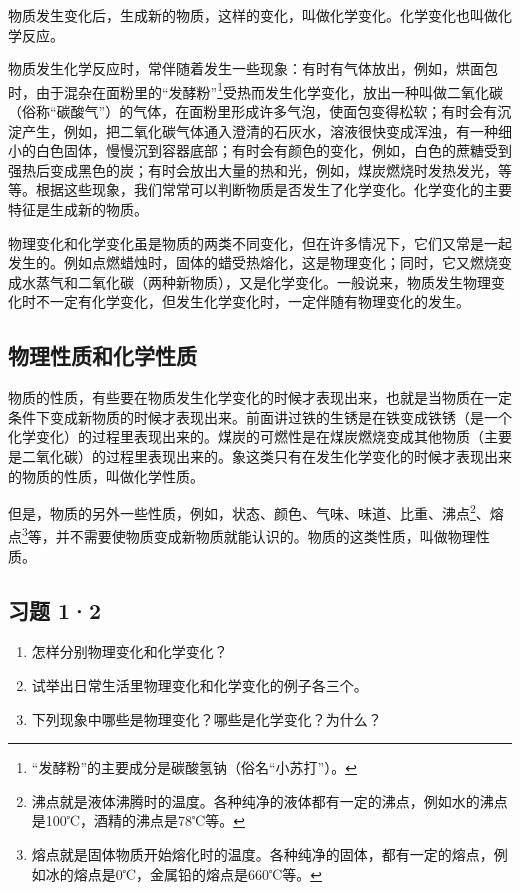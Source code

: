 物质发生变化后，生成新的物质，这样的变化，叫做化学变化。化学变化也叫做化学反应。

物质发生化学反应时，常伴随着发生一些现象：有时有气体放出，例如，烘面包时，由于混杂在面粉里的``发酵粉''\footnote{``发酵粉''的主要成分是碳酸氢钠（俗名``小苏打''）。}受热而发生化学变化，放出一种叫做二氧化碳（俗称``碳酸气''）的气体，在面粉里形成许多气泡，使面包变得松软；有时会有沉淀产生，例如，把二氧化碳气体通入澄清的石灰水，溶液很快变成浑浊，有一种细小的白色固体，慢慢沉到容器底部；有时会有颜色的变化，例如，白色的蔗糖受到强热后变成黑色的炭；有时会放出大量的热和光，例如，煤炭燃烧时发热发光，等等。根据这些现象，我们常常可以判断物质是否发生了化学变化。化学变化的主要特征是生成新的物质。

物理变化和化学变化虽是物质的两类不同变化，但在许多情况下，它们又常是一起发生的。例如点燃蜡烛时，固体的蜡受热熔化，这是物理变化；同时，它又燃烧变成水蒸气和二氧化碳（两种新物质），又是化学变化。一般说来，物质发生物理变化时不一定有化学变化，但发生化学变化时，一定伴随有物理变化的发生。

\subsection{物理性质和化学性质}

物质的性质，有些要在物质发生化学变化的时候才表现出来，也就是当物质在一定条件下变成新物质的时候才表现出来。前面讲过铁的生锈是在铁变成铁锈（是一个化学变化）的过程里表现出来的。煤炭的可燃性是在煤炭燃烧变成其他物质（主要是二氧化碳）的过程里表现出来的。象这类只有在发生化学变化的时候才表现出来的物质的性质，叫做化学性质。

但是，物质的另外一些性质，例如，状态、颜色、气味、味道、比重、沸点\footnote{沸点就是液体沸腾时的温度。各种纯净的液体都有一定的沸点，例如水的沸点是100℃，酒精的沸点是78℃等。}、熔点\footnote{熔点就是固体物质开始熔化时的温度。各种纯净的固体，都有一定的熔点，例如冰的熔点是0℃，金属铅的熔点是660℃等。}等，并不需要使物质变成新物质就能认识的。物质的这类性质，叫做物理性质。

\subsection{习题 1·2}

\begin{enumerate}
\item
  怎样分别物理变化和化学变化？
\item
  试举出日常生活里物理变化和化学变化的例子各三个。
\item
  下列现象中哪些是物理变化？哪些是化学变化？为什么？
\end{enumerate}

